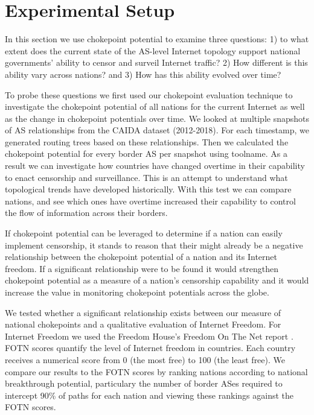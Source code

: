 \section{Experimental Setup}


In this section we use chokepoint potential to examine three questions: 1) to
what extent does the current state of the AS-level Internet topology support
national governments' ability to censor and surveil Internet traffic? 2) How
different is this ability vary across nations? and 3)  How has this ability
evolved over time?

To probe these questions we first used our chokepoint evaluation technique to
investigate the chokepoint potential of all nations for the current Internet as
well as the change in chokepoint potentials over time. We looked at multiple
snapshots of AS relationships from the CAIDA dataset (2012-2018).  For each
timestamp, we generated routing trees based on these relationships. Then we
calculated the chokepoint potential for every border AS per snapshot using
toolname{}. As a result we can investigate how countries have changed overtime
in their capability to enact censorship and surveillance. This is an attempt to
understand what topological trends have developed historically.  With this test
we can compare nations, and see which ones have overtime increased their
capability to control the flow of information across their borders.

If chokepoint potential can be leveraged to determine if a nation can easily
implement censorship, it stands to reason that their might already be a
negative relationship between the chokepoint potential of a nation and its
Internet freedom. If a significant relationship were to be found it would
strengthen chokepoint potential as a measure of a nation's censorship
capability and it would increase the value in monitoring chokepoint potentials
across the globe.

We tested whether a significant relationship exists between our measure of
national chokepoints and a qualitative evaluation of Internet Freedom. For
Internet Freedom we used the Freedom House's Freedom On The Net report
\cite{FOTN}. FOTN scores quantify the level of Internet freedom in countries.
Each country receives a numerical score from 0 (the most free) to 100 (the
least free). We compare our results to the FOTN scores by ranking nations
according to national breakthrough potential, particulary the number of border
ASes required to intercept 90\% of paths for each nation and viewing these
rankings against the FOTN scores.
